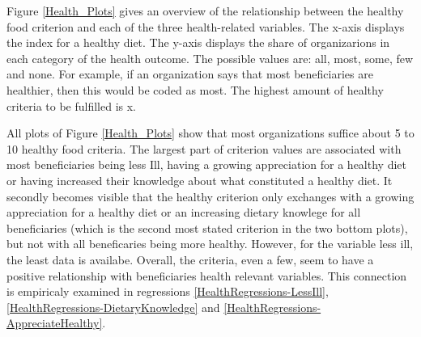 \documentclass[12pt, a4paper, titlepage]{article}\usepackage[]{graphicx}\usepackage[]{color}
\begin{document}
Figure \ref{Health_Plots} gives an overview of the relationship between the healthy food criterion and each of the three health-related variables. The x-axis displays the index for a healthy diet. The y-axis displays the share of organizarions in each category of the health outcome. The possible values are: all, most, some, few and none. For example, if an organization says that most beneficiaries are healthier, then this would be coded as most. The highest amount of healthy criteria to be fulfilled is x. 

All plots of Figure \ref{Health_Plots} show that most organizations suffice about 5 to 10 healthy food criteria. The largest part of criterion values are associated with most beneficiaries being less Ill, having a growing appreciation for a healthy diet or having increased their knowledge about what constituted a healthy diet. It secondly becomes visible that the healthy criterion only exchanges with a growing appreciation for a healthy diet or an increasing dietary knowlege for all beneficiaries (which is the second most stated criterion in the two bottom plots), but not with all beneficaries being more healthy. However, for the variable less ill, the least data is availabe. Overall, the criteria, even a few, seem to have a positive relationship with beneficiaries health relevant variables. This connection is empiricaly examined in regressions \ref{HealthRegressions-LessIll}, \ref{HealthRegressions-DietaryKnowledge} and \ref{HealthRegressions-AppreciateHealthy}.
\end{document}
